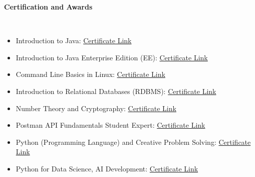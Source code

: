 \documentclass[a4paper,10pt]{article}
\newcommand{\lsep}{-0.5cm}
\newcommand{\resheading}[1]{{\small \colorbox{mygrey}{\begin{minipage}{0.975\textwidth}{\textbf{#1 \vphantom{p\^{E}}}}\end{minipage}}}}
\begin{document}
\resheading{\textbf{Certification and Awards}} \\[\lsep]
\begin{itemize}
\setlength\itemsep{0em}

\item Introduction to Java: \href{https://www.coursera.org/account/accomplishments/records/WT4DSE4XULL8}{Certificate Link}
\item Introduction to Java Enterprise Edition (EE): \href{https://www.coursera.org/account/accomplishments/records/ZYH3QZG6A6XW}{Certificate Link}
\item Command Line Basics in Linux: \href{https://www.coursera.org/account/accomplishments/records/33UDCX8YNQPW}{Certificate Link}
\item Introduction to Relational Databases (RDBMS): \href{https://www.coursera.org/account/accomplishments/records/4CDWPCCAA7CP}{Certificate Link}
\item Number Theory and Cryptography: \href{https://www.coursera.org/account/accomplishments/records/PC3EK8XVKOMO}{Certificate Link}
\item Postman API Fundamentals Student Expert: \href{https://api.badgr.io/public/assertions/chiPCzxYR3eZPxG1TrqL5w}{Certificate Link}
\item Python (Programming Language) and Creative Problem Solving: \href{https://example.com/python-problem-solving}{Certificate Link}
\item Python for Data Science, AI Development: \href{https://www.coursera.org/account/accomplishments/records/0BLWQFHIT85F}{Certificate Link}

\end{itemize}
\end{document}
